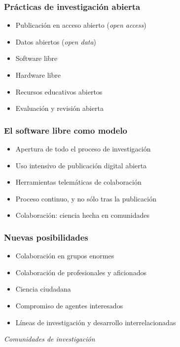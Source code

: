 \documentclass[17pt,aspectratio=169]{beamer}
\begin{document}
\begin{frame}
\frametitle{Prácticas de investigación abierta}

\begin{itemize}
\item Publicación en acceso abierto (\emph{open access})
\item Datos abiertos (\emph{open data})
\item Software libre
\item Hardware libre
\item Recursos educativos abiertos
\item Evaluación y revisión abierta
\end{itemize}

\end{frame}


\begin{frame}
\frametitle{El software libre como modelo}

\begin{itemize}
\item Apertura de todo el proceso de investigación
\item Uso intensivo de publicación digital abierta
\item Herramientas telemáticas de colaboración
\item Proceso continuo, y no sólo tras la publicación
\item Colaboración: ciencia hecha en comunidades
\end{itemize}

\end{frame}


\begin{frame}
\frametitle{Nuevas posibilidades}

\begin{itemize}
\item Colaboración en grupos enormes
\item Colaboración de profesionales y aficionados
\item Ciencia ciudadana
\item Compromiso de agentes interesados
\item Líneas de investigación y desarrollo interrelacionadas
\end{itemize}

\begin{center}
  {\Large \em Comunidades de investigación}
\end{center}
\end{frame}
\end{document}
